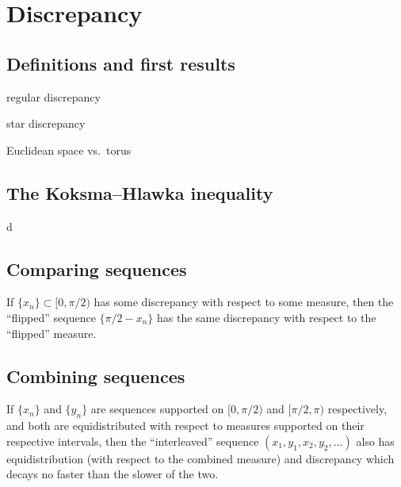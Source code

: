 
\chapter{Discrepancy}





\section{Definitions and first results}

regular discrepancy

star discrepancy

Euclidean space vs.~torus





\section{The Koksma--Hlawka inequality}

d





\section{Comparing sequences}

If $\{x_n\}\subset [0,\pi/2)$ has some discrepancy with respect to some 
measure, then the ``flipped'' sequence $\{\pi/2-x_n\}$ has the same discrepancy 
with respect to the ``flipped'' measure. 





\section{Combining sequences}

If $\{x_n\}$ and $\{y_n\}$ are sequences supported on $[0,\pi/2)$ and 
$[\pi/2,\pi)$ respectively, and both are equidistributed with respect to 
measures supported on their respective intervals, then the ``interleaved'' 
sequence $(x_1,y_1,x_2,y_2,\dots)$ also has equidistribution (with respect to 
the combined measure) and discrepancy which decays no faster than the slower of 
the two. 
